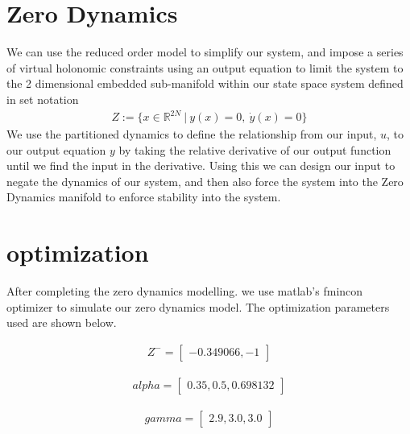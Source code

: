 \documentclass[letterpaper, 10 pt, conference]{ieeeconf}  %
\begin{document}
\section{Zero Dynamics}
We can use the reduced order model to simplify our system, and impose a series of virtual holonomic constraints using an output equation to limit the system to the 2 dimensional embedded sub-manifold within our state space system defined in set notation
\begin{equation}
\begin{aligned}
    Z := \{x \in \mathbb{R}^{2N} ~|~ y(x) = 0,~ \dot{y}(x) = 0\}
\end{aligned}
\end{equation}
We use the partitioned dynamics to define the relationship from our input, $u$, to our output equation $y$ by taking the relative derivative of our output function until we find the input in the derivative. Using this we can design our input to negate the dynamics of our system, and then also force the system into the Zero Dynamics manifold to enforce stability into the system.


\vspace{0.05cm}

\section{optimization}
After completing the zero dynamics modelling. we use matlab's fmincon optimizer to simulate our zero dynamics model. The optimization parameters used are shown below.

\begin{equation}
    \begin{aligned}
        Z^{-} = \begin{bmatrix}
             -0.349066, -1
        \end{bmatrix}
    \end{aligned}
\label{Z_minus}
\end{equation}

\begin{equation}
    \begin{aligned}
        alpha = \begin{bmatrix}
             0.35, 0.5, 0.698132
        \end{bmatrix}
    \end{aligned}
\label{Bezier_alpha}
\end{equation}

\begin{equation}
    \begin{aligned}
        gamma = \begin{bmatrix}
             2.9, 3.0, 3.0
        \end{bmatrix}
    \end{aligned}
\label{Bezier_gamma}
\end{equation}
\end{document}

